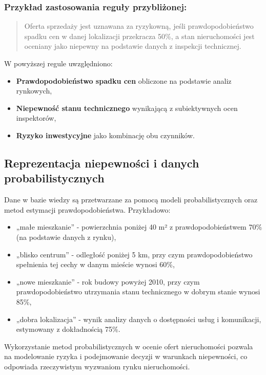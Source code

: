 \subsubsection*{Przykład zastosowania reguły przybliżonej:}
\begin{quote}
Oferta sprzedaży jest uznawana za ryzykowną, jeśli prawdopodobieństwo spadku cen w danej lokalizacji przekracza 50\%, a stan nieruchomości jest oceniany jako niepewny na podstawie danych z inspekcji technicznej.
\end{quote}

\noindent W powyższej regule uwzględniono:
\begin{itemize}
    \item \textbf{Prawdopodobieństwo spadku cen} obliczone na podstawie analiz rynkowych,
    \item \textbf{Niepewność stanu technicznego} wynikającą z subiektywnych ocen inspektorów,
    \item \textbf{Ryzyko inwestycyjne} jako kombinację obu czynników.
\end{itemize}

\subsection*{Reprezentacja niepewności i danych probabilistycznych}

Dane w bazie wiedzy są przetwarzane za pomocą modeli probabilistycznych oraz metod estymacji prawdopodobieństwa. Przykładowo:
\begin{itemize}
    \item „małe mieszkanie” - powierzchnia poniżej 40 m² z prawdopodobieństwem 70\% (na podstawie danych z rynku),
    \item „blisko centrum” - odległość poniżej 5 km, przy czym prawdopodobieństwo spełnienia tej cechy w danym mieście wynosi 60\%,
    \item „nowe mieszkanie” - rok budowy powyżej 2010, przy czym prawdopodobieństwo utrzymania stanu technicznego w dobrym stanie wynosi 85\%,
    \item „dobra lokalizacja” - wynik analizy danych o dostępności usług i komunikacji, estymowany z dokładnością 75\%.
\end{itemize}

\noindent Wykorzystanie metod probabilistycznych w ocenie ofert nieruchomości pozwala na modelowanie ryzyka i podejmowanie decyzji w warunkach niepewności, co odpowiada rzeczywistym wyzwaniom rynku nieruchomości.


